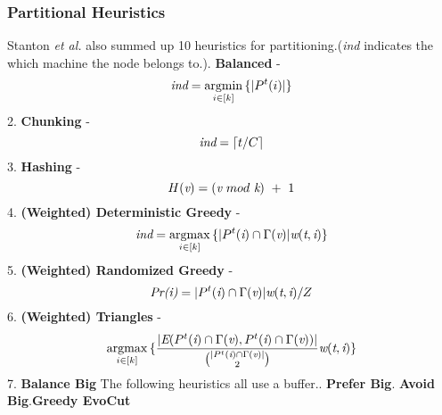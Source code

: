 \documentclass{article}
\DeclareMathOperator*{\argmin}{argmin}
\DeclareMathOperator*{\argmax}{argmax}
\begin{document}
	\subsubsection{Partitional Heuristics}
	Stanton \emph{et al.}\cite{stanton2012streaming} also summed up 10 heuristics for partitioning.(\emph{ind} indicates the which machine the node belongs to.). \textbf{Balanced} - \begin{equation} \emph{ind} = \mathop{\argmin}_{i\in[k]}{\{|P^t(i)|\}} \end{equation}
	2. \textbf{Chunking} - \begin{equation} \emph{ind} = \lceil t/C \rceil \end{equation}						%
	3. \textbf{Hashing} - \begin{equation} H(\emph{v}) = (\emph{v}~mod~\emph{k})~+~1 \end{equation}
	4. \textbf{(Weighted) Deterministic Greedy} - \begin{equation} \emph{ind}=\mathop{\argmax}_{i\in[k]}{\{|P^t(\emph{i})\cap\Gamma(\emph{v})|\emph{w}(\emph{t},\emph{i})\}} \end{equation}
	5. \textbf{(Weighted) Randomized Greedy} - \begin{equation} \emph{Pr(i)}=|P^t(\emph{i})\cap\Gamma(\emph{v})|\emph{w}(\emph{t},\emph{i})/Z \end{equation}
	6. \textbf{(Weighted) Triangles} - 
	\begin{equation}
		\mathop{\argmax}_{i\in[k]}{\{\frac{|\emph{E}(P^t(\emph{i})\cap\Gamma(\emph{v}), P^t(\emph{i})\cap\Gamma(\emph{v}))|}
		{\binom{|P^t(\emph{i})\cap\Gamma(\emph{v})|}{2}}\emph{w}(\emph{t},\emph{i})\}}
	\end{equation}
	7. \textbf{Balance Big}
	The following heuristics all use a buffer.. \textbf{Prefer Big}. \textbf{Avoid Big}.\textbf{Greedy EvoCut}\cite{andersen2009finding}
\end{document}
